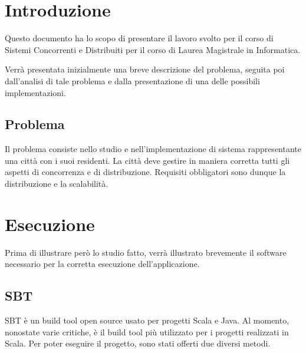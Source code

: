 \documentclass{article}
\newcommand{\Versione}{1.0}
\begin{document}
\tableofcontents 
\listoftables
\listoffigures
\newpage

\pagestyle{fancy}

\chead{}
\rhead{
	\color{black}
	\bfseries \textsf{\normalsize v.\Versione\\} 
}
\section{Introduzione}
\lettrine[lines=1]{Q}{}uesto documento ha lo scopo di presentare il lavoro svolto per il corso di Sistemi Concorrenti e Distribuiti per il corso di Laurea Magistrale in Informatica. 
\par Verr\`{a} presentata inizialmente una breve descrizione del problema, seguita poi dall\textquoteright{}analisi di tale problema e dalla presentazione di una delle possibili implementazioni.
\subsection{Problema}
\lettrine[lines=1]{I}{}l problema consiste nello studio e nell\textquoteright{}implementazione di sistema rappresentante una citt\`{a} con i suoi residenti. La citt\`{a} deve gestire in maniera corretta tutti gli aspetti di concorrenza e di distribuzione. Requisiti obbligatori sono dunque la distribuzione e la scalabilit\`{a}. 

\newpage

\pagestyle{fancy}

\chead{}
\rhead{
	\color{black}
	\bfseries \textsf{\normalsize v.\Versione\\} 
}

\section{Esecuzione}
\lettrine[lines=1]{P}{}rima di illustrare per\`{o} lo studio fatto, verr\`{a} illustrato brevemente il software necessario per la corretta esecuzione dell\textquoteright{}applicazione.
\subsection{SBT}
\lettrine[lines=1]{S}{}BT \`{e} un build tool open source usato per progetti Scala e Java. Al momento, nonostate varie critiche, \`{e} il build tool pi\`{u} utilizzato per i progetti realizzati in Scala.
Per poter eseguire il progetto, sono stati offerti due diversi metodi. 
\end{document}
